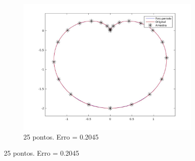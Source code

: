 \begin{figure}[ht!]
\begin{subfigure}[b]{0.31\textwidth}
		\label{fig:ex12}
	\end{subfigure}
	\hfill
	\begin{subfigure}[b]{0.31\textwidth}
		\centering
		\includegraphics[trim={5cm 2cm 3cm 2cm},clip,width=\textwidth]{img/rep_1_25.jpg}
		\caption{25 pontos. Erro = 0.2045}
		\label{fig:ex13}
	\end{subfigure}
	\label{fig:ex1rep}
\end{figure}

